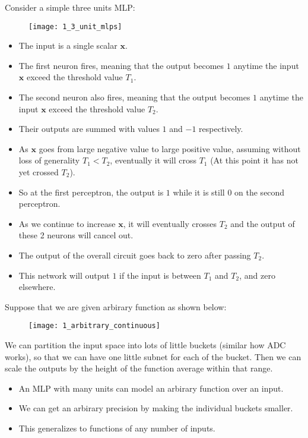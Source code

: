 \hfill\break
Consider a simple three units MLP:
\begin{figure}[H]
	\centering
	\texttt{[image: 1\_3\_unit\_mlps]}
\end{figure}

\begin{itemize}
	\item The input is a single scalar $\mathbf{x}$.
	\item The first neuron fires, meaning that the output becomes $1$ anytime the input $\mathbf{x}$ exceed the threshold value $T_1$.
	\item The second neuron also fires, meaning that the output becomes $1$ anytime the input $\mathbf{x}$ exceed the threshold value $T_2$.
	\item Their outputs are summed with values $1$ and $-1$ respectively.
	\item As $\mathbf{x}$ goes from large negative value to large positive value, assuming without loss of generality $T_1 < T_2$, eventually it will cross $T_1$ (At this point it has not yet crossed $T_2$).
	\item So at the first perceptron, the output is $1$ while it is still $0$ on the second perceptron.
	\item As we continue to increase $\mathbf{x}$, it will eventually crosses $T_2$ and the output of these 2 neurons will cancel out.
	\item The output of the overall circuit goes back to zero after passing $T_2$.
	\item This network will output $1$ if the input is between $T_1$ and $T_2$, and zero elsewhere.
\end{itemize}

\hfill\break
Suppose that we are given arbirary function as shown below:
\begin{figure}[H]
	\centering
	\texttt{[image: 1\_arbitrary\_continuous]}
\end{figure}

\hfill\break
We can partition the input space into lots of little buckets (similar how ADC works), so that we can have one little subnet for each of the bucket. Then we can scale the outputs by the height of the function average within that range.

\begin{itemize}
	\item An MLP with many units can model an arbirary function over an input.
	\item We can get an arbirary precision by making the individual buckets smaller.
	\item This generalizes to functions of any number of inputs.
\end{itemize}

